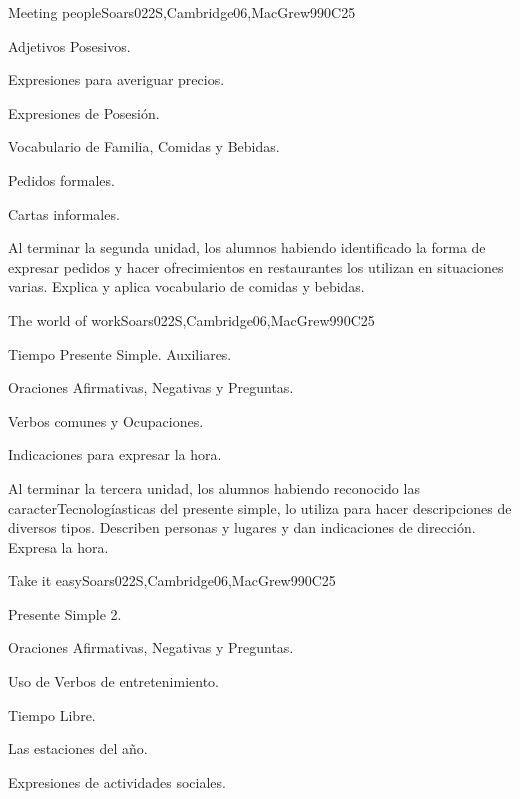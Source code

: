 \begin{syllabus}
\begin{unit}{Meeting people}{}{Soars022S,Cambridge06,MacGrew99}{0}{C25}
   \begin{topics}
      \item Adjetivos Posesivos.
      \item Expresiones para averiguar precios.
      \item Expresiones de Posesión.
      \item Vocabulario de Familia, Comidas y Bebidas.
      \item Pedidos formales.
      \item Cartas informales.
   \end{topics}

   \begin{learningoutcomes}
      \item Al terminar la segunda unidad, los alumnos habiendo identificado la forma de expresar pedidos y hacer ofrecimientos en restaurantes los utilizan en situaciones varias. Explica y aplica vocabulario de comidas y bebidas.  
   \end{learningoutcomes}

\end{unit}

\begin{unit}{The world of work}{}{Soars022S,Cambridge06,MacGrew99}{0}{C25}
   \begin{topics}
      \item Tiempo Presente Simple. Auxiliares.
      \item Oraciones Afirmativas, Negativas y Preguntas.
      \item Verbos comunes y Ocupaciones.
      \item Indicaciones para expresar la hora.
   \end{topics}

   \begin{learningoutcomes}
      \item Al terminar la tercera unidad, los alumnos habiendo reconocido las caracterTecnologíasticas  del presente simple, lo utiliza para hacer descripciones de diversos tipos. Describen personas y lugares y dan indicaciones de dirección. Expresa la hora. 
   \end{learningoutcomes}

\end{unit}

\begin{unit}{Take it easy}{}{Soars022S,Cambridge06,MacGrew99}{0}{C25}
   \begin{topics}
      \item Presente Simple 2.
      \item Oraciones Afirmativas, Negativas y Preguntas.
      \item Uso de Verbos de entretenimiento.
      \item Tiempo Libre.
      \item Las estaciones del año.
      \item Expresiones de actividades sociales.
   \end{topics}


\end{unit}
\end{syllabus}
